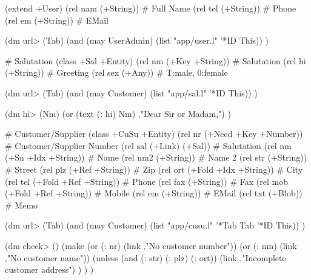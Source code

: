 \begin{wideverbatim}

(extend +User)
(rel nam (+String))                    # Full Name
(rel tel (+String))                    # Phone
(rel em (+String))                     # EMail

(dm url> (Tab)
   (and (may UserAdmin) (list "app/user.l" '*ID This)) )


# Salutation
(class +Sal +Entity)
(rel nm (+Key +String))                # Salutation
(rel hi (+String))                     # Greeting
(rel sex (+Any))                       # T:male, 0:female

(dm url> (Tab)
   (and (may Customer) (list "app/sal.l" '*ID This)) )

(dm hi> (Nm)
   (or (text (: hi) Nm) ,"Dear Sir or Madam,") )


# Customer/Supplier
(class +CuSu +Entity)
(rel nr (+Need +Key +Number))          # Customer/Supplier Number
(rel sal (+Link) (+Sal))               # Salutation
(rel nm (+Sn +Idx +String))            # Name
(rel nm2 (+String))                    # Name 2
(rel str (+String))                    # Street
(rel plz (+Ref +String))               # Zip
(rel ort (+Fold +Idx +String))         # City
(rel tel (+Fold +Ref +String))         # Phone
(rel fax (+String))                    # Fax
(rel mob (+Fold +Ref +String))         # Mobile
(rel em (+String))                     # EMail
(rel txt (+Blob))                      # Memo

(dm url> (Tab)
   (and (may Customer) (list "app/cusu.l"  '*Tab Tab  '*ID This)) )

(dm check> ()
   (make
      (or (: nr) (link ,"No customer number"))
      (or (: nm) (link ,"No customer name"))
      (unless (and (: str) (: plz) (: ort))
         (link ,"Incomplete customer address") ) ) )


\end{wideverbatim}

